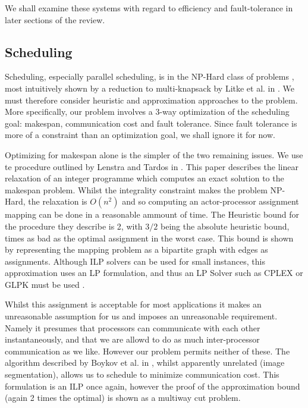 We shall examine these systems with regard to efficiency and fault-tolerance  in later sections of the review.

\subsection*{Scheduling}

Scheduling, especially parallel scheduling, is in the NP-Hard class of problems \cite{len87, kha94}, most intuitively shown by a reduction to multi-knapsack by Litke et al. in \cite{lit07}.
We must therefore consider heuristic and approximation approaches to the problem.
More specifically, our problem involves a 3-way optimization of the scheduling goal: makespan, communication cost and fault tolerance.
Since fault tolerance is more of a constraint than an optimization goal, we shall ignore it for now.

Optimizing for makespan alone is the simpler of the two remaining issues.
We use te procedure outlined by Lenstra and Tardos in \cite{len87}.
This paper describes the linear relaxation of an integer programme which computes an exact solution to the makespan problem.
Whilst the integrality constraint makes the problem NP-Hard, the relaxation is $O(n^2)$ and so computing an actor-processor assignment mapping can be done in a reasonable ammount of time.
The Heuristic bound for the procedure they describe is 2, with $3/2$ being the absolute heuristic bound, times as bad as the optimal assignment in the worst case.
This bound is shown by representing the mapping problem as a bipartite graph with edges as assignments.
Although ILP solvers can be used for small instances, this approximation uses an LP formulation, and thus an LP Solver such as CPLEX or GLPK must be used \cite{hen99}.

Whilst this assignment is acceptable for most applications it makes an unreasonable assumption for us and imposes an unreasonable requirement.
Namely it presumes that processors can communicate with each other instantaneously, and that we are allowd to do as much inter-processor communication as we like.
However our problem permits neither of these.
The algorithm described by Boykov et al. in \cite{boy01}, whilst apparently unrelated (image segmentation), allows us to schedule to minimize communication cost.
This formulation is an ILP once again, however the proof of the approximation bound (again 2 times the optimal) is shown as a multiway cut problem.

